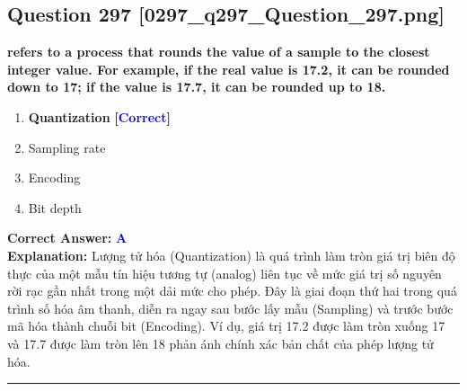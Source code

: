 \documentclass[11pt,a4paper]{article}
\begin{document}
\begin{minipage}{\textwidth}
\subsection*{Question 297 \quad \footnotesize{[0297\_q297\_Question\_297.png]}}
\noindent \textbf{refers to a process that rounds the value of a sample to the closest integer value. For example, if the real value is 17.2, it can be rounded down to 17; if the value is 17.7, it can be rounded up to 18.}

\begin{enumerate}[label=\Alph*.]
    \item \textbf{Quantization} \hfill \textcolor{blue}{\textbf{[Correct]}}
    \item Sampling rate
    \item Encoding
    \item Bit depth
\end{enumerate}

\noindent \textbf{Correct Answer:} \textcolor{blue}{\textbf{A}} \\[2pt]
\noindent \textbf{Explanation:} Lượng tử hóa (Quantization) là quá trình làm tròn giá trị biên độ thực của một mẫu tín hiệu tương tự (analog) liên tục về mức giá trị số nguyên rời rạc gần nhất trong một dải mức cho phép. Đây là giai đoạn thứ hai trong quá trình số hóa âm thanh, diễn ra ngay sau bước lấy mẫu (Sampling) và trước bước mã hóa thành chuỗi bit (Encoding). Ví dụ, giá trị 17.2 được làm tròn xuống 17 và 17.7 được làm tròn lên 18 phản ánh chính xác bản chất của phép lượng tử hóa.

\par\vspace{0.3cm}
\hrule
\vspace{0.3cm}
\end{minipage}
\end{document}
